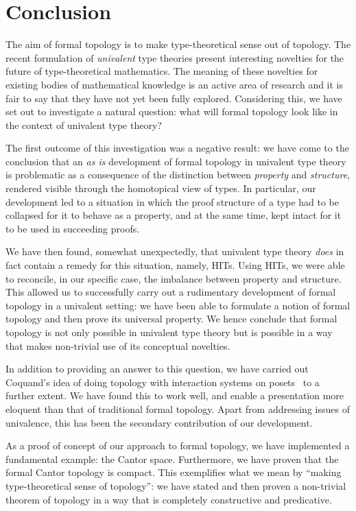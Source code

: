 \chapter{Conclusion}\label{chap:conc}

The aim of formal topology is to make type-theoretical sense out of topology. The recent
formulation of \emph{univalent} type theories present interesting novelties for the future
of type-theoretical mathematics. The meaning of these novelties for existing bodies of
mathematical knowledge is an active area of research and it is fair to say that they have
not yet been fully explored. Considering this, we have set out to investigate a
natural question: what will formal topology look like in the context of univalent type
theory?

The first outcome of this investigation was a negative result: we have come to the
conclusion that an \emph{as is} development of formal topology in univalent type theory is
problematic as a consequence of the distinction between \emph{property} and
\emph{structure}, rendered visible through the homotopical view of types. In particular,
our development led to a situation in which the proof structure of a type had to be
collapsed for it to behave as a property, and at the same time, kept intact for it to be
used in succeeding proofs.

We have then found, somewhat unexpectedly, that univalent type theory \emph{does} in fact
contain a remedy for this situation, namely, HITs. Using HITs, we were able to reconcile,
in our specific case, the imbalance between property and structure. This allowed us to
successfully carry out a rudimentary development of formal topology in a univalent
setting: we have been able to formulate a notion of formal topology and then prove its
universal property. We hence conclude that formal topology is not only possible in
univalent type theory but is possible in a way that makes non-trivial use of its
conceptual novelties.

In addition to providing an answer to this question, we have carried out Coquand's idea of
doing topology with interaction systems on posets~\cite{coq-posets} to a further extent.
We have found this to work well, and enable a presentation more eloquent than that of
traditional formal topology. Apart from addressing issues of univalence, this has been the
secondary contribution of our development.

As a proof of concept of our approach to formal topology, we have implemented a
fundamental example: the Cantor space. Furthermore, we have proven that the formal Cantor
topology is compact. This exemplifies what we mean by ``making type-theoretical sense of
topology'': we have stated and then proven a non-trivial theorem of topology in a way that
is completely constructive and predicative.


